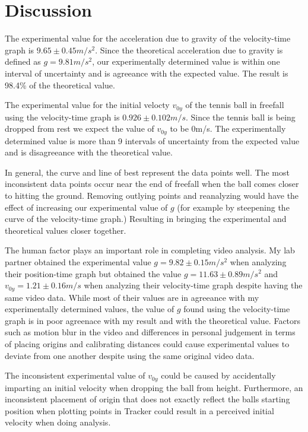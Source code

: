 \documentclass[titlepage]{article}
\begin{document}
\section{Discussion}
The experimental value for the acceleration due to gravity of the velocity-time graph is $9.65\pm0.45 m/s^2$. 
Since the theoretical acceleration due to gravity is defined as $g = 9.81m/s^2$,
our experimentally determined value is within one interval of uncertainty and is agreeance with the expected value.
The result is 98.4\% of the theoretical value.

The experimental value for the initial velocty $v_{0y}$ of the tennis ball in freefall using the velocity-time graph is $0.926\pm0.102m/s$.
Since the tennis ball is being dropped from rest we expect the value of $v_{0y}$ to be 0m/s. 
The experimentally determined value is more than 9 intervals of uncertainty from the expected value and is disagreeance with the theoretical value.

In general, the curve and line of best represent the data points well. The most inconsistent data points occur near the end of freefall when the ball comes closer to hitting the ground. 
Removing outlying points and reanalyzing would have the effect of increasing our experimental value of $g$ (for example by steepening the curve of the velocity-time graph.) Resulting in bringing the experimental and theoretical values closer together.

The human factor plays an important role in completing video analysis. My lab partner obtained the experimental value $g = 9.82\pm0.15m/s^2$ when analyzing their position-time graph but obtained the value
$g = 11.63\pm0.89m/s^2$ and $v_{0y} = 1.21\pm0.16m/s$ when analyzing their velocity-time graph despite having the same video data. While most of their values are in agreeance with my experimentally determined values, the value of $g$ found using the velocity-time graph is in poor agreenace with my result and with the theoretical value.
Factors such as motion blur in the video and differences in personal judgement in terms of placing origins and calibrating distances could cause experimental values to deviate from one another despite using the same original video data.

The inconsistent experimental value of $v_{0y}$ could be caused by accidentally imparting an initial velocity when dropping the ball from height. Furthermore, an inconsistent placement of origin
that does not exactly reflect the balls starting position when plotting points in Tracker could result in a perceived initial velocity when doing analysis. 
\end{document}

